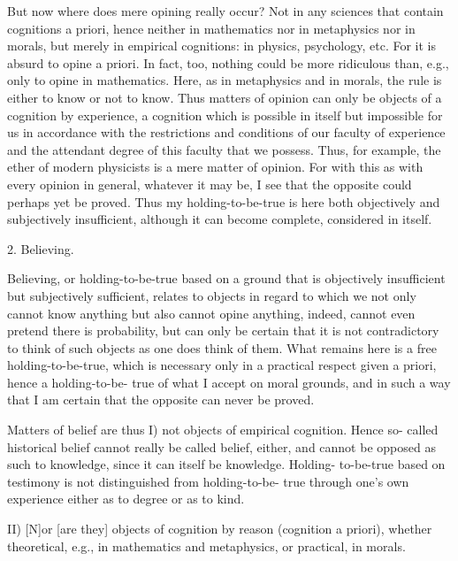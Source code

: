 But now where does mere opining really occur?
Not in any sciences that contain cognitions a priori,
hence neither in mathematics nor in metaphysics nor in morals,
but merely in empirical cognitions: in physics, psychology, etc.
For it is absurd to opine a priori.
In fact, too, nothing could be more ridiculous than, e.g.,
only to opine in mathematics.
Here, as in metaphysics and in morals,
the rule is either to know or not to know.
Thus matters of opinion can only be objects of a cognition by experience,
a cognition which is possible in itself but impossible for us in accordance
with the restrictions and conditions of our faculty of experience and the
attendant degree of this faculty that we possess.
Thus, for example, the ether of modern physicists is a mere matter of opinion.
For with this as with every opinion in general, whatever it may be,
I see that the opposite could perhaps yet be proved.
Thus my holding-to-be-true is here both objectively and subjectively insufficient,
although it can become complete, considered in itself.

2. Believing.

Believing, or holding-to-be-true based on a ground that is
objectively insufficient but subjectively sufficient, relates to objects in
regard to which we not only cannot know anything but also cannot opine
anything, indeed, cannot even pretend there is probability, but can only be
certain that it is not contradictory to think of such objects as one does
think of them. What remains here is a free holding-to-be-true, which is
necessary only in a practical respect given a priori, hence a holding-to-be-
true of what I accept on moral grounds, and in such a way that I am certain
that the opposite can never be proved.

Matters of belief are thus
I) not objects of empirical cognition. Hence so-
called historical belief cannot really be called belief, either, and cannot be
opposed as such to knowledge, since it can itself be knowledge. Holding-
to-be-true based on testimony is not distinguished from holding-to-be-
true through one's own experience either as to degree or as to kind.

II) [N]or [are they] objects of cognition by reason (cognition a priori),
whether theoretical, e.g., in mathematics and metaphysics, or practical, in
morals.

